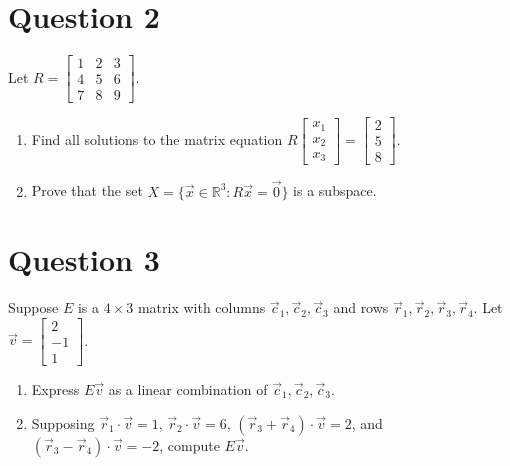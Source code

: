 \documentclass[letter]{article}
\newcommand{\R}{\mathbb{R}}
\newcommand{\mat}[1]{\begin{bmatrix}#1\end{bmatrix}}
\begin{document}
\section{Question 2}
Let $R=\mat{1&2&3\\4&5&6\\7&8&9}$.
      \begin{enumerate}
        \item Find all solutions to the matrix equation $R\mat{x_1\\x_2\\x_3}=\mat{2\\5\\8}$.
        \item Prove that the set $X=\{\vec x\in\R^3:R\vec x=\vec 0\}$ is a subspace.
      \end{enumerate}
\section{Question 3}
Suppose $E$ is a $4\times 3$ matrix with columns $\vec c_1,\vec c_2,\vec c_3$ and rows
      $\vec r_1,\vec r_2,\vec r_3,\vec r_4$.  Let $\vec v=\mat{2\\-1\\1}$.
      \begin{enumerate}
        \item Express $E\vec v$ as a linear combination of $\vec c_1,\vec c_2,\vec c_3$.
        \item Supposing $\vec r_1\cdot \vec v=1$, $\vec r_2\cdot \vec v=6$, $(\vec r_3+\vec r_4)\cdot \vec v=2$,
          and $(\vec r_3-\vec r_4)\cdot \vec v=-2$, compute $E\vec v$.
      \end{enumerate}
\end{document}
